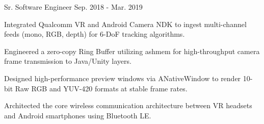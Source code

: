 \begin{cventries}
  \cventry
    {Sr. Software Engineer} %
    {} %
    {} %
    {Sep. 2018 - Mar. 2019} %
    {
      \begin{cvitems} %
        \item {Integrated Qualcomm VR and Android Camera NDK to ingest multi-channel feeds (mono, RGB, depth) for 6-DoF tracking algorithms.}
        \item {Engineered a zero-copy Ring Buffer utilizing ashmem  for high-throughput camera frame transmission to Java/Unity layers.}
        \item {Designed high-performance preview windows via ANativeWindow to render 10-bit Raw RGB and YUV-420 formats at stable frame rates.}
        \item {Architected the core wireless communication architecture between VR headsets and Android smartphones using Bluetooth LE.}
      \end{cvitems}
    }


\end{cventries}
